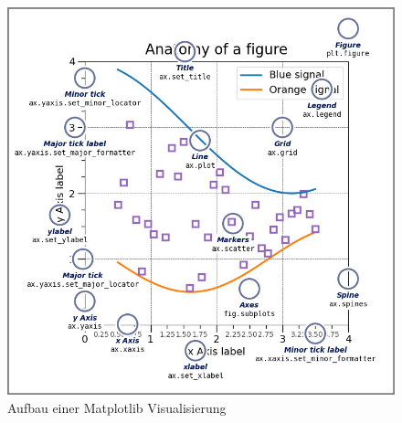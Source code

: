 \begin{figure}[H]
\centering
\includegraphics[width=.7\textwidth]{images/matplot_figure_anatomy.jpg}
\caption{Aufbau einer Matplotlib Visualisierung \protect\footnotemark}
\label{fig:matplot_fig_anatomy}
\end{figure}


